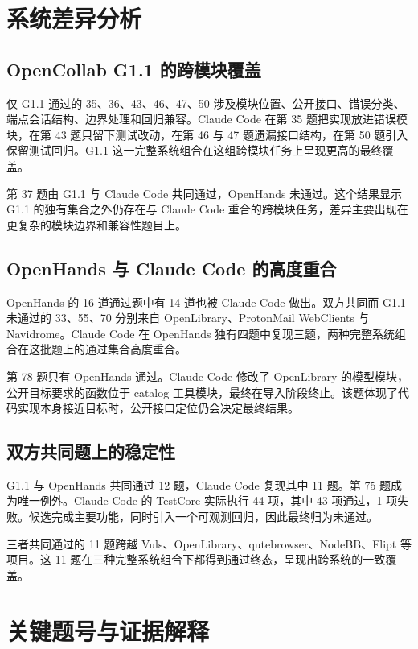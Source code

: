 \documentclass[11pt,a4paper,fontset=fandol]{ctexart}
\begin{document}
\section{系统差异分析}

\subsection{OpenCollab G1.1 的跨模块覆盖}

仅 G1.1 通过的 35、36、43、46、47、50 涉及模块位置、公开接口、错误分类、端点会话结构、边界处理和回归兼容。Claude Code 在第 35 题把实现放进错误模块，在第 43 题只留下测试改动，在第 46 与 47 题遗漏接口结构，在第 50 题引入保留测试回归。G1.1 这一完整系统组合在这组跨模块任务上呈现更高的最终覆盖。

第 37 题由 G1.1 与 Claude Code 共同通过，OpenHands 未通过。这个结果显示 G1.1 的独有集合之外仍存在与 Claude Code 重合的跨模块任务，差异主要出现在更复杂的模块边界和兼容性题目上。

\subsection{OpenHands 与 Claude Code 的高度重合}

OpenHands 的 16 道通过题中有 14 道也被 Claude Code 做出。双方共同而 G1.1 未通过的 33、55、70 分别来自 OpenLibrary、ProtonMail WebClients 与 Navidrome。Claude Code 在 OpenHands 独有四题中复现三题，两种完整系统组合在这批题上的通过集合高度重合。

第 78 题只有 OpenHands 通过。Claude Code 修改了 OpenLibrary 的模型模块，公开目标要求的函数位于 catalog 工具模块，最终在导入阶段终止。该题体现了代码实现本身接近目标时，公开接口定位仍会决定最终结果。

\subsection{双方共同题上的稳定性}

G1.1 与 OpenHands 共同通过 12 题，Claude Code 复现其中 11 题。第 75 题成为唯一例外。Claude Code 的 TestCore 实际执行 44 项，其中 43 项通过，1 项失败。候选完成主要功能，同时引入一个可观测回归，因此最终归为未通过。

三者共同通过的 11 题跨越 Vuls、OpenLibrary、qutebrowser、NodeBB、Flipt 等项目。这 11 题在三种完整系统组合下都得到通过终态，呈现出跨系统的一致覆盖。

\section{关键题号与证据解释}
\end{document}
